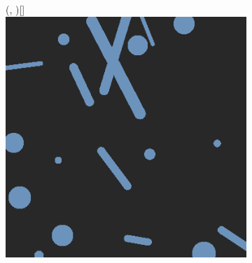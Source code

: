 \begin{figure}[H]
\begin{subfigure}{\w}
{        }
    \end{subfigure}
    \hspace*{\fill}
    \begin{subfigure}{\w}
        \makebox(\textwidth, \textwidth)[\textwidth]{
            \includegraphics[width=\linewidth]{figures/generated-worlds/world_2.png}
        }
    \end{subfigure}

    \vspace{4mm}


\end{figure}
